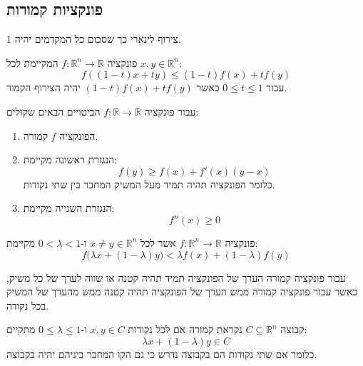 \documentclass{tstextbook}
\begin{document}
\subsection{פונקציות קמורות}

\begin{definition}
צירוף לינארי כך שסכום כל המקדמים יהיה 1.

\end{definition}
\begin{definition}
פונקציה \(f:\mathbb{R}^{n}\to \mathbb{R}\) המקיימת לכל \(x,y \in \mathbb{R}^{n}\):
$$f((1-t)x+ty)\leq (1-t)f(x)+tf(y)$$
עבור \(0\leq t \leq 1\) כאשר \((1-t)f(x)+tf(y)\) יהיה הצירוף הקמור.

\end{definition}
\begin{proposition}
עבור פונקציה \(f:\mathbb{R}\to \mathbb{R}\) הביטויים הבאים שקולים:

  \begin{enumerate}
    \item הפונקציה \(f\) קמורה. 


    \item הנגזרת ראשונה מקיימת: 
$$f(y)\geq f(x)+f'(x)(y-x)$$
כלומר הפונקציה תהיה תמיד מעל המשיק המחבר בין שתי נקודות.


    \item הנגזרת השנייה מקיימת: 
$$f''(x)\geq 0$$


  \end{enumerate}
\end{proposition}
\begin{definition}
פונקציה \(f:\mathbb{R}^{n}\to \mathbb{R}\) אשר לכל \(x\neq y \in \mathbb{R}^{n}\) ו-\(0<\lambda<1\) מקיימת:
$$f{\big(}\lambda x+(1-\lambda)y{\big)}<\lambda f(x)+(1-\lambda)f(y)$$

\end{definition}
\begin{remark}
עבור פונקציה קמורה הערך של הפונקציה תמיד תהיה קטנה או שווה לערך של כל משיק, כאשר עבור פונקציה קמורה ממש הערך של הפונקציה תהיה קטנה ממש מהערך של המשיק בכל נקודה.

\end{remark}
\begin{definition}
קבוצה \(C\subseteq \mathbb{R}^{n}\) נקראת קמורה אם לכל נקודות \(x,y \in {C}\) ו-\(0\leq \lambda \leq 1\) מתקיים:
$$\lambda x+(1-\lambda)y\in C$$
כלומר אם שתי נקודות הם בקבוצה נדרש כי גם הקו המחבר ביניהם יהיה בקבוצה.

\end{definition}
\end{document}
